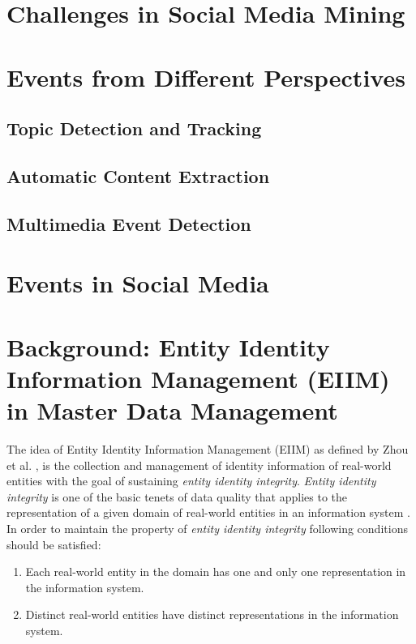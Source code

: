\section{Challenges in Social Media Mining}




\section{Events from Different Perspectives}

\subsection{Topic Detection and Tracking}

\subsection{Automatic Content Extraction}

\subsection{Multimedia Event Detection}

\section{Events in Social Media}

\section{Background: Entity Identity Information Management (EIIM) in Master Data Management}
The idea of Entity Identity Information Management (EIIM) as defined by Zhou et al. \cite{zhou2011entity}, is the collection and management of identity information of real-world entities with the goal of sustaining \textit{entity identity integrity}. \textit{Entity identity integrity} is one of the basic tenets of data quality that applies to the representation of a given domain of real-world entities in an information system \cite{talburt2011entity}. In order to maintain the property of \textit{entity identity integrity} following conditions should be satisfied:

\begin{enumerate}
\item Each real-world entity in the domain has one and only one representation in the information system.

\item Distinct real-world entities have distinct representations in the information system.
\end{enumerate}


